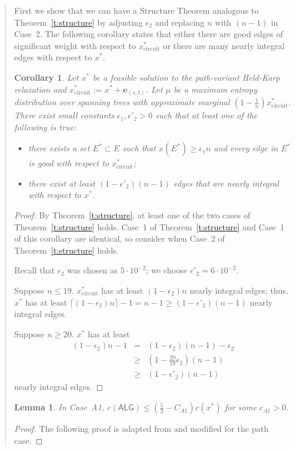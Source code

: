 \documentclass[11pt,letterpaper]{article}
\newtheorem{lemma}{Lemma}
\newtheorem{cor}{Corollary}
\begin{document}
\begin{quote}
First we show that we can have a Structure Theorem analogous to Theorem~\ref{t:structure} by adjusting $\epsilon_2$ and replacing $n$ with $(n-1)$ in Case~2. The following corollary states that either there are good edges of significant weight with respect to $x^*_{\mathrm{circuit}}$ or there are many nearly integral edges with respect to $x^*$.
\begin{cor}
\label{c:pathstructure}
Let $x^*$ be a feasible solution to the path-variant Held-Karp relaxation and  $x^*_{\mathrm{circuit}} := x^*+\mathbf{\mathbf{e}}_{(s,t)}$. Let $\mu$ be a maximum entropy distribution over spanning trees with approximate marginal $(1-\frac{1}{n}) x^*_{\mathrm{circuit}}$. There exist small constants $\epsilon_1 , \epsilon'_2 >0$ such that at least one of the following is true:\begin{itemize}
\item[1.] there exists a set $E^*\subset E$ such that $x(E^*)\geq \epsilon_1 n$ and every edge in $E^*$ is good with respect to $x^*_{\mathrm{circuit}}$;
\item[2.] there exist at least $(1-\epsilon'_2)(n-1)$ edges that are nearly integral with respect to $x^*$.
\end{itemize}
\end{cor}
\begin{proof}
By Theorem~\ref{t:structure}, at least one of the two cases of Theorem~\ref{t:structure} holds. Case~1 of Theorem~\ref{t:structure} and Case~1 of this corollary are identical, so consider when Case~2 of Theorem~\ref{t:structure} holds.

Recall that $\epsilon_2$ was chosen as $5\cdot 10^{-2}$; we choose $\epsilon'_2=6\cdot 10^{-2}$.

Suppose $n\leq 19$. $x^*_{\mathrm{circuit}}$ has at least $(1-\epsilon_2)n$ nearly integral edges; thus, $x^*$ has at least $\lceil (1-\epsilon_2)n\rceil - 1 = n-1\geq (1-\epsilon'_2)(n-1)$ nearly integral edges.

Suppose $n\geq 20$. $x^*$ has at least\begin{eqnarray*}
(1-\epsilon_2)n-1&=&(1-\epsilon_2)(n-1)-\epsilon_2\\
&\geq& (1-\frac{20}{19}\epsilon_2)(n-1)\\
&\geq& (1-\epsilon'_2)(n-1)
\end{eqnarray*}nearly integral edges.
\end{proof}

\begin{lemma}
\label{l:fca1}
In Case~A1, $c(\mathsf{ALG})\leq (\frac{5}{3}-C_{A1})c(x^*)$ for some $c_{A1}>0$.
\end{lemma}
\begin{proof}
The following proof is adapted from \cite{OSS} and modified for the path case.


\end{proof}
\end{quote}
\end{document}
